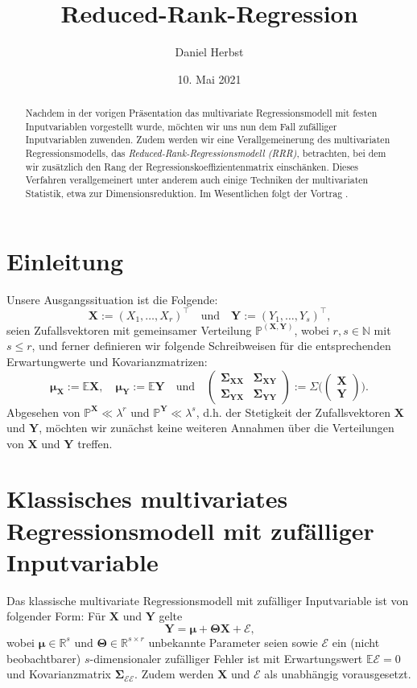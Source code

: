 \documentclass[]{article}
\title{Reduced-Rank-Regression}
\author{Daniel Herbst}
\date{10. Mai 2021}
\newcommand{\Pb}{\mathbb{P}}
\newcommand{\E}{\mathbb{E}}
\newcommand{\R}{\mathbb{R}}
\newcommand{\N}{\mathbb{N}}
\newcommand{\X}{\mathbf{X}}
\newcommand{\Y}{\mathbf{Y}}
\newcommand{\T}{\mathbf{\Theta}}
\newcommand{\muu}{\bm{\mu}}
\newcommand{\Ssigma}{\mathbf{\Sigma}}
\begin{document}
\maketitle

\begin{abstract}
Nachdem in der vorigen Präsentation das multivariate Regressionsmodell mit festen Inputvariablen vorgestellt wurde, möchten wir uns nun dem Fall zufälliger Inputvariablen zuwenden. Zudem werden wir eine Verallgemeinerung des multivariaten Regressionsmodells, das
\textit{Reduced-Rank-Regressionsmodell (RRR)}, betrachten, bei dem wir zusätzlich den Rang der Regressionskoeffizientenmatrix einschänken. Dieses Verfahren verallgemeinert unter anderem auch einige Techniken der multivariaten Statistik, etwa zur Dimensionsreduktion. Im Wesentlichen folgt der Vortrag 
\cite[Kapitel 6.3]{Iz08}.
\end{abstract}

\section{Einleitung}
\label{Einleitung}
Unsere Ausgangssituation ist die Folgende:
$$\X := (X_1, \dots, X_r)^\top \quad \text{und} \quad \Y := (Y_1, \dots, Y_s)^\top \text{,}$$
seien Zufallsvektoren mit gemeinsamer Verteilung $\Pb^{(\X, \Y)}$, wobei $r, s \in \N$ mit $s \leq r$,
und ferner definieren wir folgende Schreibweisen für die entsprechenden Erwartungwerte und Kovarianzmatrizen:
$$ \muu_\X := \E\X, \quad \muu_\Y := \E\Y \quad \text{und} \quad \begin{pmatrix}
	\Ssigma_{\X\X} & \Ssigma_{\X\Y} \\
	\Ssigma_{\Y\X} & \Ssigma_{\Y\Y}
\end{pmatrix} := \Sigma \biggl(\begin{pmatrix}
\X \\
\Y
\end{pmatrix}\biggr).$$
Abgesehen von $\Pb^\X \ll \lambda^r$ und $\Pb^\Y \ll \lambda^s$, d.h. der Stetigkeit der Zufallsvektoren $\X$ und $\Y$, möchten wir zunächst keine
weiteren Annahmen über die Verteilungen von $\X$ und $\Y$ treffen.

\section{Klassisches multivariates Regressionsmodell mit zufälliger Inputvariable}

Das klassische multivariate Regressionsmodell mit zufälliger Inputvariable ist von folgender Form: Für $\X$ und $\Y$ gelte
\[ \Y = \muu + \T \X + \mathcal{E} \text{,} \label{eq:2.1} \tag{2.1}\]
wobei $\muu \in \R^s$ und $\T \in \R^{s \times r}$ unbekannte Parameter seien sowie $\mathcal{E}$ ein (nicht beobachtbarer) $s$-dimensionaler zufälliger Fehler ist mit Erwartungswert $\E \mathcal{E} = 0$ und Kovarianzmatrix $\Ssigma_{\mathcal{E} \mathcal{E}}$. Zudem werden $\X$ und
$\mathcal{E}$ als unabhängig vorausgesetzt.
\\
\end{document}
